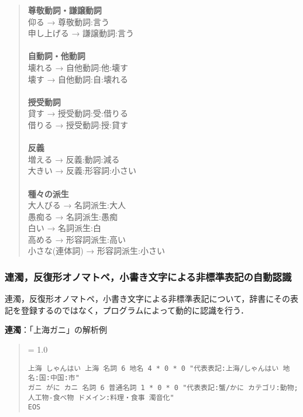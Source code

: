 \documentclass[a4j,titlepage]{jarticle}
\begin{document}
\begin{quote}
{\bf 尊敬動詞・謙譲動詞} \\
仰る → 尊敬動詞:言う \\
申し上げる → 謙譲動詞:言う \\
 \\
{\bf 自動詞・他動詞} \\
壊れる → 自他動詞:他:壊す \\
壊す → 自他動詞:自:壊れる \\
 \\
{\bf 授受動詞} \\
貸す → 授受動詞:受:借りる \\
借りる → 授受動詞:授:貸す \\
 \\
{\bf 反義} \\
増える → 反義:動詞:減る \\
大きい → 反義:形容詞:小さい \\
 \\
{\bf 種々の派生} \\
大人びる → 名詞派生:大人 \\
愚痴る → 名詞派生:愚痴 \\
白い → 名詞派生:白 \\
高める → 形容詞派生:高い \\
小さな(連体詞) → 形容詞派生:小さい \\
\end{quote}


\subsubsection{連濁，反復形オノマトペ，小書き文字による非標準表記の自動認識}

連濁，反復形オノマトペ，小書き文字による非標準表記について，辞書にその表
記を登録するのではなく，プログラムによって動的に認識を行う．

\noindent
{\bf 連濁}：「上海ガニ」の解析例
\begin{quote}
{\baselineskip = 1.0 \baselineskip
\begin{verbatim}
上海 しゃんはい 上海 名詞 6 地名 4 * 0 * 0 "代表表記:上海/しゃんはい 地名:国:中国:市"
ガニ がに カニ 名詞 6 普通名詞 1 * 0 * 0 "代表表記:蟹/かに カテゴリ:動物;人工物-食べ物 ドメイン:料理・食事 濁音化"
EOS
\end{verbatim}
}
\end{quote}
\end{document}
